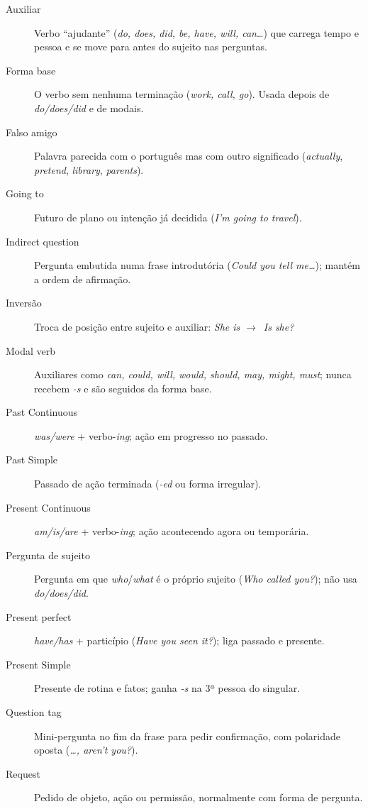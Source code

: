 \documentclass[12pt,a4paper,oneside]{book}
\newcommand{\en}[1]{\textit{#1}}                 %
\newcommand{\ra}{$\rightarrow$}
\begin{document}
\begin{description}
  \item[Auxiliar] Verbo ``ajudante'' (\en{do, does, did, be, have, will, can}\ldots) que carrega tempo e pessoa e se move para antes do sujeito nas perguntas.
  \item[Forma base] O verbo sem nenhuma terminação (\en{work, call, go}). Usada depois de \en{do/does/did} e de modais.
  \item[Falso amigo] Palavra parecida com o português mas com outro significado (\en{actually}, \en{pretend}, \en{library}, \en{parents}).
  \item[Going to] Futuro de plano ou intenção já decidida (\en{I'm going to travel}).
  \item[Indirect question] Pergunta embutida numa frase introdutória (\en{Could you tell me\ldots}); mantém a ordem de afirmação.
  \item[Inversão] Troca de posição entre sujeito e auxiliar: \en{She is} \ra\ \en{Is she?}
  \item[Modal verb] Auxiliares como \en{can, could, will, would, should, may, might, must}; nunca recebem \en{-s} e são seguidos da forma base.
  \item[Past Continuous] \en{was/were} + verbo-\en{ing}; ação em progresso no passado.
  \item[Past Simple] Passado de ação terminada (\en{-ed} ou forma irregular).
  \item[Present Continuous] \en{am/is/are} + verbo-\en{ing}; ação acontecendo agora ou temporária.
  \item[Pergunta de sujeito] Pergunta em que \en{who}/\en{what} é o próprio sujeito (\en{Who called you?}); não usa \en{do/does/did}.
  \item[Present perfect] \en{have/has} + particípio (\en{Have you seen it?}); liga passado e presente.
  \item[Present Simple] Presente de rotina e fatos; ganha \en{-s} na 3ª pessoa do singular.
  \item[Question tag] Mini-pergunta no fim da frase para pedir confirmação, com polaridade oposta (\en{\ldots, aren't you?}).
  \item[Request] Pedido de objeto, ação ou permissão, normalmente com forma de pergunta.

\end{description}
\end{document}
